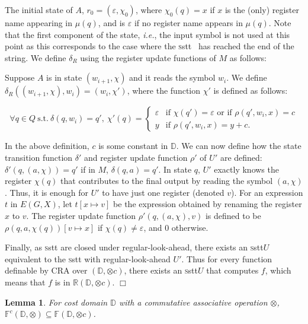 \documentclass[11pt]{article}
\newtheorem{lemma}[theorem]{Lemma}
\def\qed{{\bf $\Box$}}
\def\qed{{\bf $\Box$}}
\newcommand{\domain}{\ensuremath{\mathbb{D}}}
\newcommand{\CG}{G}
\newcommand{\CF}{{\mathbb F}}
\newcommand{\CCF}{{\mathbb F}^c}
\newcommand{\reg}[1]{{\mathbb R}(#1)}
\newcommand{\SSTT}{{\sc\textsc sstt}\xspace}
\newcommand{\stt}{\ensuremath{U}}
\newcommand{\EDWA}{{CRA}\xspace}
\newcommand{\edwa}{\ensuremath{M}}
\newcommand{\edwavarup}{\ensuremath{\rho}}
\newcommand{\edwafinal}{\ensuremath{\mu}}
\newcommand{\ie}{{\em i.e.}\xspace}
\def\myplus{\otimes}
\begin{document}
The initial state of $A$, $r_0 = (\varepsilon,\chi_0)$, where
$\chi_0(q)=x$ if $x$ is the (only) register name appearing in
$\edwafinal(q)$, and is $\varepsilon$ if no register name appears in
$\edwafinal(q)$. Note that the first component of the state, \ie, the
input symbol is not used at this point as this corresponds to the case
where the \SSTT~ has reached the end of the string. We define
$\delta_R$ using the register update functions of $\edwa$ as follows:

Suppose $A$ is in state $(w_{i+1},\chi)$ and it reads the symbol
$w_i$.  We define $\delta_R((w_{i+1},\chi),w_i) = (w_i,\chi')$, where
the function $\chi'$ is defined as follows:

\[
    \forall q \in Q\ \text{s.t.}\ \delta(q,w_i) = q',\ \chi'(q) = \left\{
            \begin{array}{ll}
                \varepsilon & \text{if $\chi(q') = \varepsilon$ or if $\edwavarup(q',w_i,x) = c$}  \\
                y           & \text{if $\edwavarup(q',w_i,x) = y + c$}.
            \end{array}
                \right.
\]

In the above definition, $c$ is some constant in $\domain$.
We can now define how the state transition function $\delta'$ and
register update function $\rho'$ of $\stt'$ are defined:
$\delta'(q,(a,\chi)) = q'$ if in $\edwa$, $\delta(q,a) = q'$.  In
state $q$, $\stt'$ exactly knows the register $\chi(q)$ that
contributes to the final output by reading the symbol $(a,\chi)$.
Thus, it is enough for $\stt'$ to have just one register (denoted
$v$).  For an expression $t$ in $E(\CG,X)$, let $t[x\mapsto v]$ be the
expression obtained by renaming the register $x$ to $v$.  The register
update function $\rho'(q,(a,\chi),v)$ is defined to be
$\edwavarup(q,a,\chi(q))[v\mapsto x]$ if $\chi(q) \neq \varepsilon$,
and $0$ otherwise.

Finally, as \SSTT are closed under regular-look-ahead, there exists an
\SSTT $\stt$ equivalent to the \SSTT with regular-look-ahead $\stt'$.
Thus for every function definable by \EDWA over $(\domain, \myplus
c)$, there exists an \SSTT $\stt$ that computes $f$, which means that
$f$ is in $\reg{\domain,\myplus c}$.
\qed


\begin{lemma}
\label{ppcedwatopedwa}
For cost domain $\domain$ with a commutative associative operation
$\myplus$, $\CCF(\domain,\myplus)\subseteq \CF(\domain,\myplus c)$.
\end{lemma}
\end{document}
